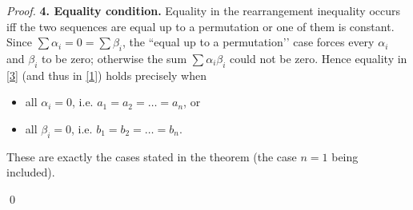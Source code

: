 \begin{proof}
\medskip\noindent\textbf{4. Equality condition.}  
Equality in the rearrangement inequality occurs iff the two sequences are equal up to a permutation or one of them is constant.  
Since $\sum\alpha_i=0=\sum\beta_i$, the “equal up to a permutation’’ case forces every $\alpha_i$ and $\beta_i$ to be zero; otherwise the sum $\sum\alpha_i\beta_i$ could not be zero. Hence equality in \eqref{3} (and thus in \eqref{1}) holds precisely when

\begin{itemize}
\item all $\alpha_i=0$, i.e. $a_1=a_2=\dots =a_n$, or
\item all $\beta_i=0$, i.e. $b_1=b_2=\dots =b_n$.
\end{itemize}
These are exactly the cases stated in the theorem (the case $n=1$ being included).

\qed
\end{proof}